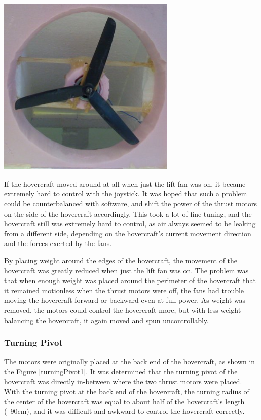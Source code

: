 \begin{center}
  \includegraphics[width=85mm]{imageSources/weightDistro2.png}
\end{center}
\label{weightDistro2}

If the hovercraft moved around at all when just the lift fan was on, it became extremely hard to control with the joystick. It was hoped that such a problem could be counterbalanced with software, and shift the power of the thrust motors on the side of the hovercraft accordingly. This took a lot of fine-tuning, and the hovercraft still was extremely hard to control, as air always seemed to be leaking from a different side, depending on the hovercraft's current movement direction and the forces exerted by the fans.

By placing weight around the edges of the hovercraft, the movement of the hovercraft was greatly reduced when just the lift fan was on. The problem was that when enough weight was placed around the perimeter of the hovercraft that it remained motionless when the thrust motors were off, the fans had trouble moving the hovercraft forward or backward even at full power. As weight was removed, the motors could control the hovercraft more, but with less weight balancing the hovercraft, it again moved and spun uncontrollably.

\subsubsection{Turning Pivot}
The motors were originally placed at the back end of the hovercraft, as shown in the Figure \ref{turningPivot1}.  It was determined that the turning pivot of the hovercraft was directly in-between where the two thrust motors were placed. With the turning pivot at the back end of the hovercraft, the turning radius of the center of the hovercraft was equal to about half of the hovercraft's length (~90cm), and it was difficult and awkward to control the hovercraft correctly. 

